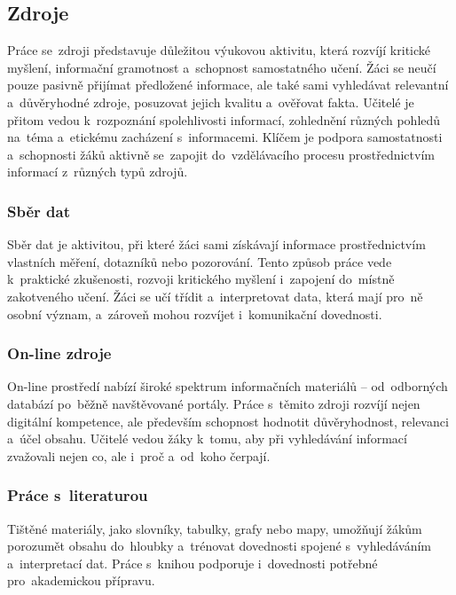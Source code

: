 \documentclass[male,czech,api_bc]{kitheses}
\begin{document}
\subsection{Zdroje}

Práce se~zdroji představuje důležitou výukovou aktivitu, která rozvíjí kritické myšlení, informační gramotnost a~schopnost samostatného učení. Žáci se neučí pouze pasivně přijímat předložené informace, ale také sami vyhledávat relevantní a~důvěryhodné zdroje, posuzovat jejich kvalitu a~ověřovat fakta. Učitelé je přitom vedou k~rozpoznání spolehlivosti informací, zohlednění různých pohledů na~téma a~etickému zacházení s~informacemi. Klíčem je podpora samostatnosti a~schopnosti žáků aktivně se~zapojit do~vzdělávacího procesu prostřednictvím informací z~různých typů zdrojů.

\subsubsection{Sběr dat}

Sběr dat je aktivitou, při které žáci sami získávají informace prostřednictvím vlastních měření, dotazníků nebo pozorování. Tento způsob práce vede k~praktické zkušenosti, rozvoji kritického myšlení i~zapojení do~místně zakotveného učení. Žáci se učí třídit a~interpretovat data, která mají pro~ně osobní význam, a~zároveň mohou rozvíjet i~komunikační dovednosti.

\subsubsection{On-line zdroje}

On-line prostředí nabízí široké spektrum informačních materiálů – od~odborných databází po~běžně navštěvované portály. Práce s~těmito zdroji rozvíjí nejen digitální kompetence, ale především schopnost hodnotit důvěryhodnost, relevanci a~účel obsahu. Učitelé vedou žáky k~tomu, aby při vyhledávání informací zvažovali nejen co, ale i~proč a~od~koho čerpají.

\subsubsection{Práce s~literaturou}

Tištěné materiály, jako slovníky, tabulky, grafy nebo mapy, umožňují žákům porozumět obsahu do~hloubky a~trénovat dovednosti spojené s~vyhledáváním a~interpretací dat. Práce s~knihou podporuje i~dovednosti potřebné pro~akademickou přípravu.
\end{document}
